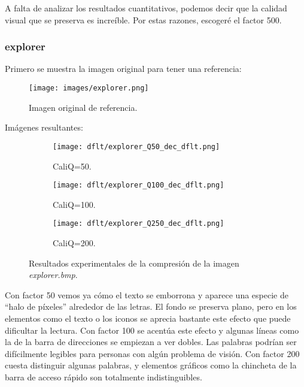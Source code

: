 \documentclass[12pt,a4paper]{article}
\begin{document}
A falta de analizar los resultados cuantitativos, podemos decir que la calidad visual que se preserva es increíble. Por estas razones, escogeré el factor 500.\\

\subsubsection{explorer}
Primero se muestra la imagen original para tener una referencia:
\begin{figure}[H]
    \centering
    \texttt{[image: images/explorer.png]}
    \caption[Referencia - explorer]{Imagen original de referencia.}
    
\end{figure}
    
    \vspace{0.5cm}

Imágenes resultantes:
\begin{figure}[H]
    
    \begin{subfigure}{0.30\textwidth}
        \centering
        \texttt{[image: dflt/explorer\_Q50\_dec\_dflt.png]}
        \caption{CaliQ=50.}
        
    \end{subfigure}
    \hfill
    \begin{subfigure}{0.30\textwidth}
        \centering
        \texttt{[image: dflt/explorer\_Q100\_dec\_dflt.png]}
        \caption{CaliQ=100.}
        
    \end{subfigure}
    \hfill
    \begin{subfigure}{0.30\textwidth}
        \centering
        \texttt{[image: dflt/explorer\_Q250\_dec\_dflt.png]}
        \caption{CaliQ=200.}
        
    \end{subfigure}
    
    \caption[Resultados experimentales - explorer]{Resultados experimentales de la compresión de la imagen \textit{explorer.bmp}.}
    
\end{figure}

Con factor 50 vemos ya cómo el texto se emborrona y aparece una especie de ``halo de píxeles'' alrededor de las letras. El fondo se preserva plano, pero en los elementos como el texto o los iconos se aprecia bastante este efecto que puede dificultar la lectura. Con factor 100 se acentúa este efecto y algunas líneas como la de la barra de direcciones se empiezan a ver dobles. Las palabras podrían ser difícilmente legibles para personas con algún problema de visión. Con factor 200 cuesta distinguir algunas palabras, y elementos gráficos como la chincheta de la barra de acceso rápido son totalmente indistinguibles.\\
\end{document}
